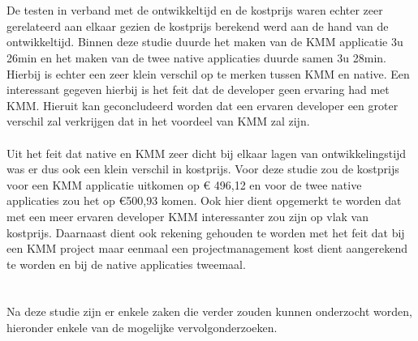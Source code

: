 \\ \\
De testen in verband met de ontwikkeltijd en de kostprijs waren echter zeer gerelateerd aan elkaar gezien de kostprijs berekend werd aan de hand van de ontwikkeltijd. Binnen deze studie duurde het maken van de KMM applicatie 3u 26min en het maken van de twee native applicaties duurde samen 3u 28min. Hierbij is echter een zeer klein verschil op te merken tussen KMM en native. Een interessant gegeven hierbij is het feit dat de developer geen ervaring had met KMM. Hieruit kan geconcludeerd worden dat een ervaren developer een groter verschil zal verkrijgen dat in het voordeel van KMM zal zijn.
\\ \\
Uit het feit dat native en KMM zeer dicht bij elkaar lagen van ontwikkelingstijd was er dus ook een klein verschil in kostprijs. Voor deze studie zou de kostprijs voor een KMM applicatie uitkomen op \euro{} 496,12 en voor de twee native applicaties zou het op €500,93 komen. Ook hier dient opgemerkt te worden dat met een meer ervaren developer KMM interessanter zou zijn op vlak van kostprijs. Daarnaast dient ook rekening gehouden te worden met het feit dat bij een KMM project maar eenmaal een projectmanagement kost dient aangerekend te worden en bij de native applicaties tweemaal.

\section{}
\label{sec:C-verder-onderzoek}
Na deze studie zijn er enkele zaken die verder zouden kunnen onderzocht worden, hieronder enkele van de mogelijke vervolgonderzoeken.

